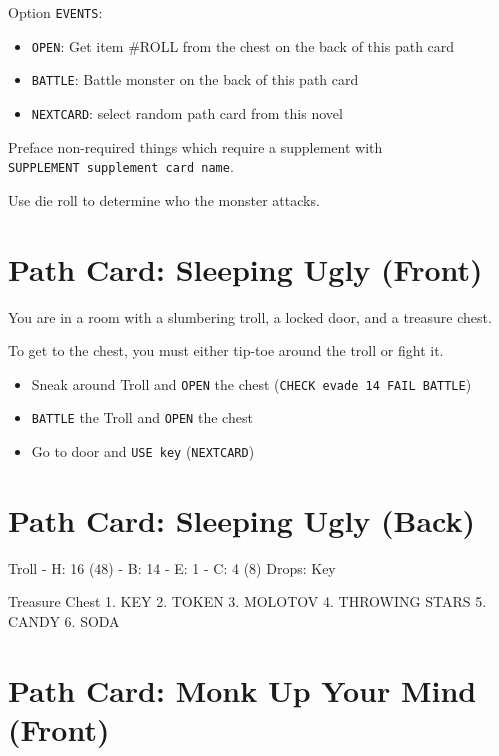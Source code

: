 Option \texttt{EVENTS}:

\begin{itemize}
\tightlist
\item
  \texttt{OPEN}: Get item \#ROLL from the chest on the back of this path
  card
\item
  \texttt{BATTLE}: Battle monster on the back of this path card
\item
  \texttt{NEXTCARD}: select random path card from this novel
\end{itemize}

Preface non-required things which require a supplement with
\texttt{SUPPLEMENT\ supplement\ card\ name}.

Use die roll to determine who the monster attacks.

\section{Path Card: Sleeping Ugly
(Front)}\label{path-card-sleeping-ugly-front}

You are in a room with a slumbering troll, a locked door, and a treasure
chest.

To get to the chest, you must either tip-toe around the troll or fight
it.

\begin{itemize}
\tightlist
\item
  Sneak around Troll and \texttt{OPEN} the chest
  (\texttt{CHECK\ evade\ 14\ FAIL\ BATTLE})
\item
  \texttt{BATTLE} the Troll and \texttt{OPEN} the chest
\item
  Go to door and \texttt{USE\ key} (\texttt{NEXTCARD})
\end{itemize}

\section{Path Card: Sleeping Ugly
(Back)}\label{path-card-sleeping-ugly-back}

Troll - H: 16 (48) - B: 14 - E: 1 - C: 4 (8) Drops: Key

Treasure Chest 1. KEY 2. TOKEN 3. MOLOTOV 4. THROWING STARS 5. CANDY 6.
SODA

\section{Path Card: Monk Up Your Mind
(Front)}\label{path-card-monk-up-your-mind-front}

